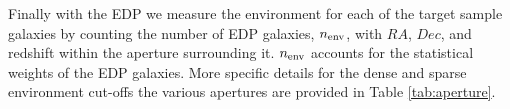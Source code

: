 \documentclass{emulateapj}
\begin{document}
Finally with the EDP we measure the environment for each of the target sample galaxies by counting the number
of EDP galaxies, $n_{\rm{env}}$, with $RA$, $Dec$, and redshift within the aperture surrounding it. 
$n_{\rm{env}}$ accounts for the statistical weights of the EDP galaxies. 
More specific details for the dense and sparse environment cut-offs the various apertures are provided in Table \ref{tab:aperture}.

\begin{figure*}
    \begin{center}
        \leavevmode
        \label{fig:smf}
        \caption{Evolution of the quiescent fraction for target galaxies in low (left) and (high) environments
from redshift range $z=0-0.8$. The QFs were calculated using the SMFs specificed in Figure \ref{fig:smf}. We use
lighter shades of orange for the QFs at higher redshifts.}
    \end{center}
\end{figure*}
\end{document}
